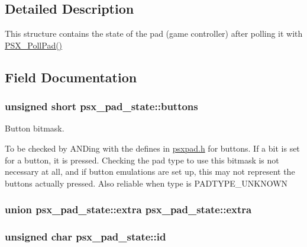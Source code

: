 \subsection{Detailed Description}
This structure contains the state of the pad (game controller) after polling it with \hyperlink{psx_8h_a3375af2214d2bb2d8694e65c586d3fa4}{P\+S\+X\+\_\+\+Poll\+Pad()} 

\subsection{Field Documentation}
\hypertarget{structpsx__pad__state_a26b197aa183a342446072509c0d1b800}{}
\subsubsection[{buttons}]{\setlength{\rightskip}{0pt plus 5cm}unsigned short psx\+\_\+pad\+\_\+state\+::buttons}\label{structpsx__pad__state_a26b197aa183a342446072509c0d1b800}


Button bitmask. 

To be checked by A\+N\+D\textquotesingle{}ing with the defines in \hyperlink{psxpad_8h}{psxpad.\+h} for buttons. If a bit is set for a button, it is pressed. Checking the pad type to use this bitmask is not necessary at all, and if button emulations are set up, this may not represent the buttons actually pressed. Also reliable when type is P\+A\+D\+T\+Y\+P\+E\+\_\+\+U\+N\+K\+N\+O\+W\+N \hypertarget{structpsx__pad__state_a82998866e9a2516123c4b9974f598e9f}{}
\subsubsection[{extra}]{\setlength{\rightskip}{0pt plus 5cm}union {\bf psx\+\_\+pad\+\_\+state\+::extra} {\bf psx\+\_\+pad\+\_\+state\+::extra}}\label{structpsx__pad__state_a82998866e9a2516123c4b9974f598e9f}
\hypertarget{structpsx__pad__state_a2dadce1fa3022f813bd1cab8523bd61b}{}
\subsubsection[{id}]{\setlength{\rightskip}{0pt plus 5cm}unsigned char psx\+\_\+pad\+\_\+state\+::id}\label{structpsx__pad__state_a2dadce1fa3022f813bd1cab8523bd61b}


